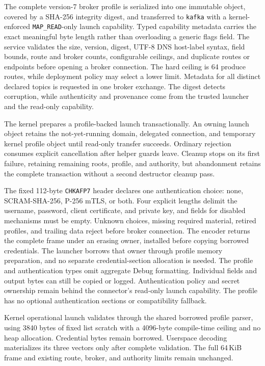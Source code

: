 The complete version-7 broker profile is serialized into one immutable object,
covered by a SHA-256 integrity digest, and transferred to \texttt{kafka} with a
kernel-enforced \texttt{MAP\_READ}-only launch capability. Typed capability
metadata carries the exact meaningful byte length rather than overloading a
generic flags field. The service validates the size, version, digest, UTF-8 DNS
host-label syntax, field bounds, route and broker counts, configurable ceilings,
and duplicate routes or endpoints before opening a broker connection. The hard
ceiling is 64 produce routes, while deployment policy may select a lower limit.
Metadata for all distinct declared topics is requested in one broker exchange.
The digest detects corruption, while authenticity and provenance come from the
trusted launcher and the read-only capability.

The kernel prepares a profile-backed launch transactionally. An owning launch
object retains the not-yet-running domain, delegated connection, and temporary
kernel profile object until read-only transfer succeeds. Ordinary rejection
consumes explicit cancellation after helper guards leave. Cleanup stops on its
first failure, retaining remaining roots, profile, and authority, but abandonment
retains the complete transaction without a second destructor cleanup pass.

The fixed 112-byte \texttt{CHKAFP7} header declares one authentication choice:
none, SCRAM-SHA-256, P-256 mTLS, or both. Four explicit
lengths delimit the username, password, client certificate, and private key, and
fields for disabled mechanisms must be empty. Unknown choices, missing required
material, retired profiles, and trailing data reject before broker connection.
The encoder returns the complete frame under an erasing owner, installed before
copying borrowed credentials. The launcher borrows that owner through profile
memory preparation, and no separate credential-section allocation is needed. The
profile and authentication types omit aggregate Debug formatting. Individual
fields and output bytes can still be copied or logged. Authentication policy
and secret ownership remain behind the connector's read-only launch capability.
The profile has no optional authentication sections or compatibility fallback.

Kernel operational launch validates through the shared borrowed profile parser,
using 3840 bytes of fixed list scratch with a 4096-byte compile-time ceiling
and no heap allocation. Credential bytes remain borrowed. Userspace decoding
materializes its three vectors only after complete validation. The full 64\,KiB
frame and existing route, broker, and authority limits remain unchanged.

